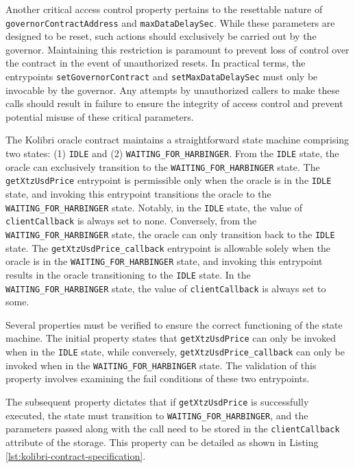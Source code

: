 \documentclass[a4paper,UKenglish,cleveref, autoref, thm-restate]{lipics-v2021}
\begin{document}
Another critical access control property pertains to the resettable nature of \lstinline/governorContractAddress/ and \lstinline/maxDataDelaySec/. While these parameters are designed to be reset, such actions should exclusively be carried out by the governor. Maintaining this restriction is paramount to prevent loss of control over the contract in the event of unauthorized resets. In practical terms, the entrypoints \lstinline/setGovernorContract/ and \lstinline/setMaxDataDelaySec/ must only be invocable by the governor. Any attempts by unauthorized callers to make these calls should result in failure to ensure the integrity of access control and prevent potential misuse of these critical parameters.

The Kolibri oracle contract maintains a straightforward state machine comprising two states: (1) \lstinline/IDLE/ and (2) \lstinline/WAITING_FOR_HARBINGER/. From the \lstinline/IDLE/ state, the oracle can exclusively transition to the \lstinline/WAITING_FOR_HARBINGER/ state. The \lstinline/getXtzUsdPrice/ entrypoint is permissible only when the oracle is in the \lstinline/IDLE/ state, and invoking this entrypoint transitions the oracle to the \lstinline/WAITING_FOR_HARBINGER/ state. Notably, in the \lstinline/IDLE/ state, the value of \lstinline/clientCallback/ is always set to none. Conversely, from the \lstinline/WAITING_FOR_HARBINGER/ state, the oracle can only transition back to the \lstinline/IDLE/ state. The \lstinline/getXtzUsdPrice_callback/ entrypoint is allowable solely when the oracle is in the \lstinline/WAITING_FOR_HARBINGER/ state, and invoking this entrypoint results in the oracle transitioning to the \lstinline/IDLE/ state. In the \lstinline/WAITING_FOR_HARBINGER/ state, the value of \lstinline/clientCallback/ is always set to some.

Several properties must be verified to ensure the correct functioning of the state machine. The initial property states that \lstinline/getXtzUsdPrice/ can only be invoked when in the \lstinline/IDLE/ state, while conversely, \lstinline/getXtzUsdPrice_callback/ can only be invoked when in the \lstinline/WAITING_FOR_HARBINGER/ state. The validation of this property involves examining the fail conditions of these two entrypoints.

The subsequent property dictates that if \lstinline/getXtzUsdPrice/ is successfully executed, the state must transition to \lstinline/WAITING_FOR_HARBINGER/, and the parameters passed along with the call need to be stored in the \lstinline/clientCallback/ attribute of the storage. This property can be detailed as shown in Listing \ref{lst:kolibri-contract-specification}.
\end{document}

